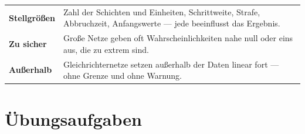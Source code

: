 \begin{warnung}
\begin{center}
{\small
\renewcommand{\arraystretch}{1.52}
\begin{tabular}{@{}P{2.6cm}P{6.0cm}@{}}
\toprule
\textbf{Stellgrößen} & Zahl der Schichten und Einheiten, Schrittweite, Strafe, Abbruchzeit, Anfangswerte --- jede beeinflusst das Ergebnis.\\
\textbf{Zu sicher} & Große Netze geben oft Wahrscheinlichkeiten nahe null oder eins aus, die zu extrem sind.\\
\textbf{Außerhalb} & Gleichrichternetze setzen außerhalb der Daten linear fort --- ohne Grenze und ohne Warnung.\\
\bottomrule
\end{tabular}}
\end{center}

\begin{center}
\begin{minipage}{0.88\textwidth}
\end{minipage}
\end{center}
\end{warnung}

\section{Übungsaufgaben}

